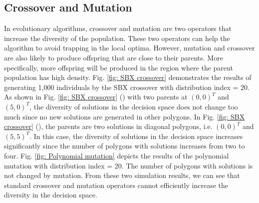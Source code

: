 \documentclass[conference]{IEEEtran}
\begin{document}
\subsection{Crossover and Mutation}
In evolutionary algorithms, crossover and mutation are two operators that increase the diversity of the population. These two operators can help the algorithm to avoid trapping in the local optima. However, mutation and crossover are also likely to produce offspring that are close to their parents. More specifically, more offspring will be produced in the region where the parent population has high density. Fig. \ref{fig: SBX crossover} demonstrates the results of generating 1,000 individuals by the SBX\cite{deb1995simulated} crossover with distribution index = 20. As shown in Fig. \ref{fig: SBX crossover} () with two parents at $(0, 0)^T$ and $(5, 0)^T$, the diversity of solutions in the decision space does not change too much since no new solutions are generated in other polygons. In Fig. \ref{fig: SBX crossover} (), the parents are two solutions in diagonal polygons, i.e. $(0, 0)^T$ and $(5, 5)^T$. In this case, the diversity of solutions in the decision space increases significantly since the number of polygons with solutions increases from two to four. Fig. \ref{fig: Polynomial mutation} depicts the results of the polynomial mutation with distribution index = 20. The number of polygons with solutions is not changed by mutation. From these two simulation results, we can see that standard crossover and mutation operators cannot efficiently increase the diversity in the decision space.
\end{document}
